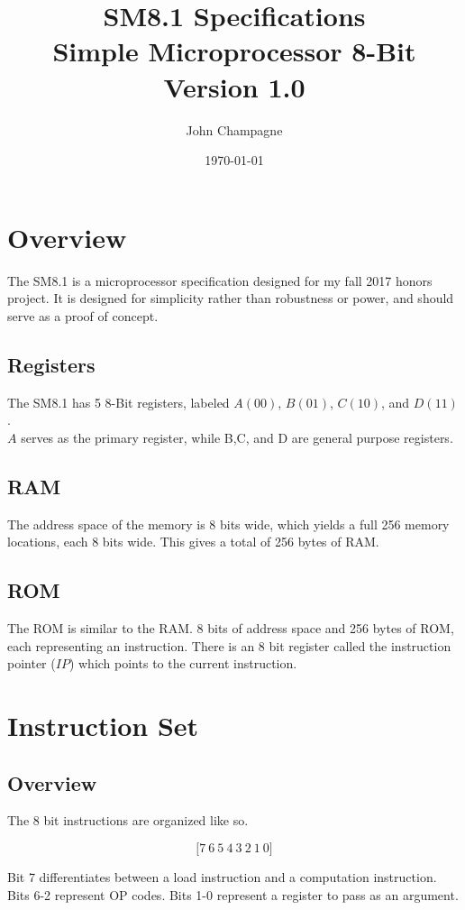 \documentclass[11pt]{article}
\title{\textbf{SM8.1 Specifications}\\Simple Microprocessor 8-Bit\\Version 1.0}
\author{John Champagne}
\date{\today}
\begin{document}
\maketitle
\section{Overview}
The SM8.1 is a microprocessor specification designed for my fall 2017 honors project. It is designed for simplicity rather than robustness or power, and should serve as a proof of concept.
\subsection{Registers}
The SM8.1 has 5 8-Bit registers, labeled $A (00)$, $B(01)$, $C(10)$, and $D(11)$.\\
$A$ serves as the primary register, while B,C, and D are general purpose registers.
\subsection{RAM}
The address space of the memory is 8 bits wide, which yields a full 256 memory locations, each 8 bits wide. This gives a total of 256 bytes of RAM.
\subsection{ROM}
The ROM is similar to the RAM. 8 bits of address space and 256 bytes of ROM, each representing an instruction. There is an 8 bit register called the instruction pointer ($IP$) which points to the current instruction.

\section{Instruction Set}
\subsection{Overview}
The 8 bit instructions are organized like so.

$$\big[7\ 6\ 5\ 4\ 3\ 2\ 1\ 0\big]$$

Bit 7 differentiates between a load instruction and a computation instruction. Bits 6-2 represent OP codes. Bits 1-0 represent a register to pass as an argument.
\end{document}
